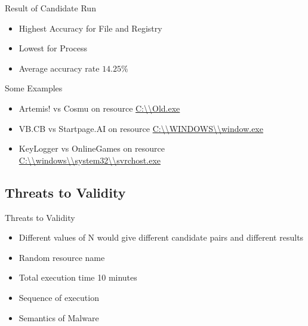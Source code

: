 \documentclass[]{beamer}
\begin{document}
\begin{frame}[t]{Result of Candidate Run}
\begin{itemize}
  \item Highest Accuracy for File and Registry
  \item Lowest for Process
  \item Average accuracy rate $14.25\%$
\end{itemize}
\end{frame}
\begin{frame}{Some Examples}
  \begin{itemize}
    \item Artemis! vs Cosmu on resource \url{C:\\Old.exe}
    \item VB.CB vs Startpage.AI on resource \url{C:\\WINDOWS\\window.exe}
    \item KeyLogger vs OnlineGames on resource \url{C:\\windows\\system32\\svrchost.exe}
  \end{itemize}
  
\end{frame}
\subsection{Threats to Validity}
\label{sub:Threats to Validity}
\begin{frame}{Threats to Validity}
  \begin{itemize}
    \item Different values of N would give different candidate pairs and different results
    \item Random resource name
    \item Total execution time 10 minutes
    \item Sequence of execution
    \item Semantics of Malware
  \end{itemize}
\end{frame}
\end{document}
